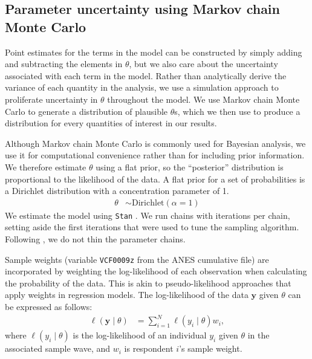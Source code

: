 \documentclass[12pt
               ,final
               ]{article}
\begin{document}
\subsection*{Parameter uncertainty using Markov chain Monte Carlo}

Point estimates for the terms in the model can be constructed by simply adding and subtracting the elements in $\theta$, but we also care about the uncertainty associated with each term in the model. Rather than analytically derive the variance of each quantity in the analysis, we use a simulation approach to proliferate uncertainty in $\theta$ throughout the model. We use Markov chain Monte Carlo to generate a distribution of plausible $\theta$s, which we then use to produce a distribution for every quantities of interest in our results.

Although Markov chain Monte Carlo is commonly used for Bayesian analysis, we use it for computational convenience rather than for including prior information. We therefore estimate $\theta$ using a flat prior, so the ``posterior'' distribution is proportional to the likelihood of the data. A flat prior for a set of probabilities is a Dirichlet distribution with a concentration parameter of 1.
  \begin{align}
    \theta &\sim \mathrm{Dirichlet}\left( \alpha = 1 \right)
  \end{align}
We estimate the model using \texttt{Stan} \citep{carpenter2016stan}. We run  \unskip chains with  \unskip iterations per chain, setting aside the first  \unskip iterations that were used to tune the sampling algorithm. Following \citet{Link2011}, we do not thin the parameter chains. 

Sample weights (variable \texttt{VCF0009z} from the ANES cumulative file) are incorporated by weighting the log-likelihood of each observation when calculating the probability of the data. This is akin to pseudo-likelihood approaches that apply weights in regression models. The log-likelihood of the data $\mathbf{y}$ given $\theta$ can be expressed as follows:
  \begin{align}
    \ell(\mathbf{y} \mid \theta) &= \sum\limits_{i = 1}^{N} \ell(y_{i} \mid \theta)  w_{i},
  \end{align}
where $\ell(y_{i} \mid \theta)$ is the log-likelihood of an individual $y_{i}$ given $\theta$ in the associated sample wave, and $w_{i}$ is respondent $i$'s sample weight. 
\end{document}
